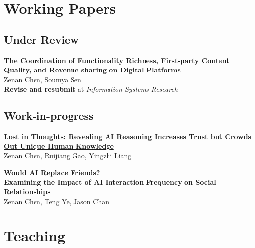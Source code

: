 \documentclass[11pt]{article} %
\newcommand{\ind}{\leavevmode{\parindent=1em\indent}}
\begin{document}




\section*{Working Papers}

\subsection*{Under Review}

\textbf{The Coordination of Functionality Richness, First-party Content Quality, and Revenue-sharing on Digital Platforms}\\
Zenan Chen, Soumya Sen\\
\ind \textbf{Revise and resubmit} at \textit{Information Systems Research}

\subsection*{Work-in-progress}

\textbf{\href{https://arxiv.org/abs/2511.04050}{Lost in Thoughts: Revealing AI Reasoning Increases Trust but Crowds Out Unique Human Knowledge}} \\
Zenan Chen, Ruijiang Gao, Yingzhi Liang

\medskip

\textbf{Would AI Replace Friends? \\ Examining the Impact of AI Interaction Frequency on Social Relationships} \\
Zenan Chen, Teng Ye, Jason Chan \\








\section*{Teaching}
\end{document}
